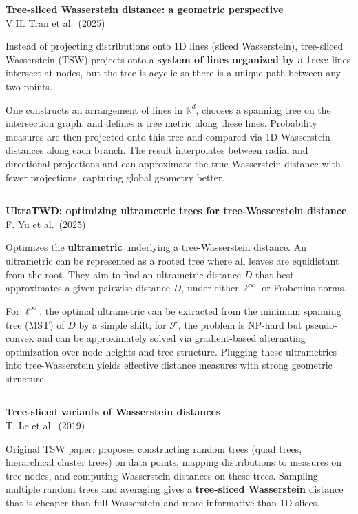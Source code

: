 \documentclass[a5paper]{article}
\begin{document}
\textbf{Tree-sliced Wasserstein distance: a geometric perspective}\\
V.H. Tran et al.~(2025)

Instead of projecting distributions onto 1D lines (sliced Wasserstein),
tree-sliced Wasserstein (TSW) projects onto a \textbf{system of lines
organized by a tree}: lines intersect at nodes, but the tree is acyclic
so there is a unique path between any two points.

One constructs an arrangement of lines in $\mathbb{R}^d$, chooses a spanning tree on
the intersection graph, and defines a tree metric along these lines.
Probability measures are then projected onto this tree and compared via
1D Wasserstein distances along each branch. The result interpolates
between radial and directional projections and can approximate the true
Wasserstein distance with fewer projections, capturing global geometry
better.

\begin{center}\rule{0.5\linewidth}{0.5pt}\end{center}

\textbf{UltraTWD: optimizing ultrametric trees for tree-Wasserstein
distance}\\
F. Yu et al.~(2025)

Optimizes the \textbf{ultrametric} underlying a tree-Wasserstein
distance. An ultrametric can be represented as a rooted tree where all
leaves are equidistant from the root. They aim to find an ultrametric
distance $\tilde D$ that best approximates a given pairwise distance $D$,
under either $\ell^\infty$ or Frobenius norms.

For $\ell^\infty$, the optimal ultrametric can be extracted from the minimum
spanning tree (MST) of $D$ by a simple shift; for $\mathcal{F}$, the problem is
NP-hard but pseudo-convex and can be approximately solved via
gradient-based alternating optimization over node heights and tree
structure. Plugging these ultrametrics into tree-Wasserstein yields
effective distance measures with strong geometric structure.

\begin{center}\rule{0.5\linewidth}{0.5pt}\end{center}

\textbf{Tree-sliced variants of Wasserstein distances}\\
T. Le et al.~(2019)

Original TSW paper: proposes constructing random trees (quad trees,
hierarchical cluster trees) on data points, mapping distributions to
measures on tree nodes, and computing Wasserstein distances on these
trees. Sampling multiple random trees and averaging gives a
\textbf{tree-sliced Wasserstein} distance that is cheaper than full
Wasserstein and more informative than 1D slices.
\end{document}
